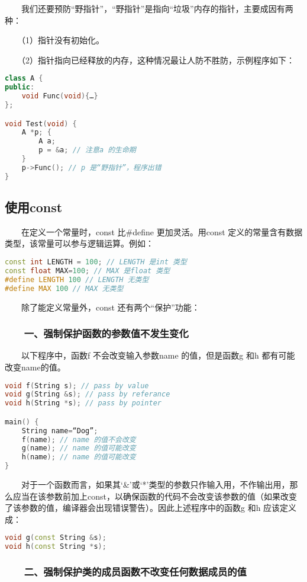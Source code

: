 \documentclass[11pt]{article}
\begin{document}
　　我们还要预防“野指针”，“野指针”是指向“垃圾”内存的指针，主要成因有两种：

　　（1）指针没有初始化。

　　（2）指针指向已经释放的内存，这种情况最让人防不胜防，示例程序如下：
\begin{lstlisting}[language=c++]
class A {
public:
    void Func(void){…}
};

void Test(void) {
    A *p; {
        A a;
        p = &a; // 注意a 的生命期
    }
    p->Func(); // p 是“野指针”，程序出错
}
\end{lstlisting}
\subsection{使用const}
\label{sec-2-4}

　　在定义一个常量时，const 比\#define 更加灵活。用const 定义的常量含有数据类型，该常量可以参与逻辑运算。例如：
\begin{lstlisting}[language=c++]
const int LENGTH = 100; // LENGTH 是int 类型
const float MAX=100; // MAX 是float 类型
#define LENGTH 100 // LENGTH 无类型
#define MAX 100 // MAX 无类型
\end{lstlisting}

　　除了能定义常量外，const 还有两个“保护”功能：

\subsubsection{　　一、强制保护函数的参数值不发生变化}
\label{sec-2-4-1}

　　以下程序中，函数f 不会改变输入参数name 的值，但是函数g 和h 都有可能改变name的值。
\begin{lstlisting}[language=c++]
void f(String s); // pass by value
void g(String &s); // pass by referance
void h(String *s); // pass by pointer

main() {
    String name=“Dog”;
    f(name); // name 的值不会改变
    g(name); // name 的值可能改变
    h(name); // name 的值可能改变
}
\end{lstlisting}

　　对于一个函数而言，如果其‘\&’或‘*’类型的参数只作输入用，不作输出用，那么应当在该参数前加上const，以确保函数的代码不会改变该参数的值（如果改变了该参数的值，编译器会出现错误警告）。因此上述程序中的函数g 和h 应该定义成：
\begin{lstlisting}[language=c++]
void g(const String &s);
void h(const String *s);
\end{lstlisting}
\subsubsection{　　二、强制保护类的成员函数不改变任何数据成员的值}
\label{sec-2-4-2}
\end{document}
